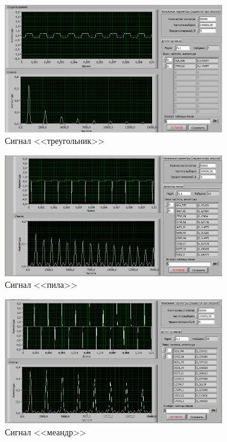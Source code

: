\begin{figure}[H]
	\centering
	\includegraphics[width=0.85\textwidth]{pic/diff/triangle.png}
	\caption{Сигнал <<треугольник>>}
	
\end{figure}
\begin{figure}[H]
	\centering
	\includegraphics[width=0.85\textwidth]{pic/diff/pila.png}
	\caption{Сигнал <<пила>>}
	
\end{figure}
\begin{figure}[H]
	\centering
	\includegraphics[width=0.85\textwidth]{pic/diff/meandr.png}
	\caption{Сигнал <<меандр>>}	
\end{figure}





